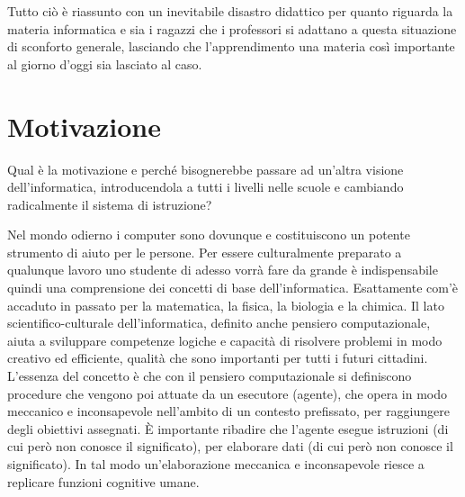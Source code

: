 \documentclass[11pt,a4paper]{article}
\begin{document}
Tutto ciò è riassunto con un inevitabile disastro didattico per quanto
riguarda la materia informatica e sia i ragazzi che i professori si
adattano a questa situazione di sconforto generale, lasciando che
l'apprendimento una materia così importante al giorno d'oggi sia
lasciato al caso.

\section{Motivazione}

Qual è la motivazione e perché bisognerebbe passare ad un'altra
visione dell'informatica, introducendola a tutti i livelli nelle
scuole e cambiando radicalmente il sistema di istruzione?

Nel mondo odierno i computer sono dovunque e costituiscono un potente
strumento di aiuto per le persone. Per essere culturalmente preparato
a qualunque lavoro uno studente di adesso vorrà fare da grande è
indispensabile quindi una comprensione dei concetti di base
dell'informatica. Esattamente com'è accaduto in passato per la
matematica, la fisica, la biologia e la chimica. Il lato
scientifico-culturale dell'informatica, definito anche pensiero
computazionale, aiuta a sviluppare competenze logiche e capacità di
risolvere problemi in modo creativo ed efficiente, qualità che sono
importanti per tutti i futuri cittadini. L'essenza del concetto è che
con il pensiero computazionale si definiscono procedure che vengono
poi attuate da un esecutore (agente), che opera in modo meccanico e
inconsapevole nell'ambito di un contesto prefissato, per raggiungere
degli obiettivi assegnati. \`E importante ribadire che l'agente esegue
istruzioni (di cui però non conosce il significato), per elaborare
dati (di cui però non conosce il significato). In tal modo
un'elaborazione meccanica e inconsapevole riesce a replicare funzioni
cognitive umane.
\end{document}
